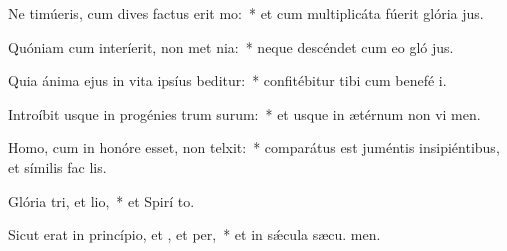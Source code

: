 \item Ne timúeris, cum dives factus erit mo:~* et cum multiplicáta fúerit glória  jus.
\item Quóniam cum interíerit, non met nia:~* neque descéndet cum eo gló jus.
\item Quia ánima ejus in vita ipsíus beditur:~* confitébitur tibi cum benefé i.
\item Introíbit usque in progénies trum surum:~* et usque in ætérnum non vi men.
\item Homo, cum in honóre esset, non telxit:~* comparátus est juméntis insipiéntibus, et símilis fac  lis.
\item Glória tri, et lio,~* et Spirí to.
\item Sicut erat in princípio, et , et per,~* et in sǽcula sæcu. men.

